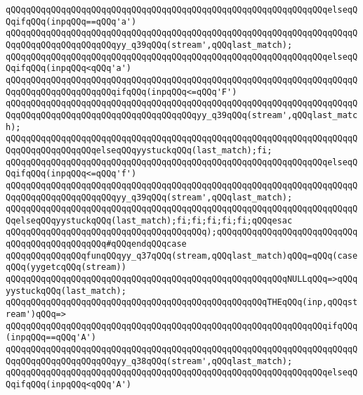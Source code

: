 \verb|qQQqqQQqqQQqqQQqqQQqqQQqqQQqqQQqqQQqqQQqqQQqqQQqqQQqqQQqqQQqqQQqelseqQQqifqQQq(inpqQQq==qQQq'a')|\newline
\verb|qQQqqQQqqQQqqQQqqQQqqQQqqQQqqQQqqQQqqQQqqQQqqQQqqQQqqQQqqQQqqQQqqQQqqQQqqQQqqQQqqQQqqQQqqQQqyy_q39qQQq(stream',qQQqlast_match);|\newline
\verb|qQQqqQQqqQQqqQQqqQQqqQQqqQQqqQQqqQQqqQQqqQQqqQQqqQQqqQQqqQQqqQQqelseqQQqifqQQq(inpqQQq<qQQq'a')|\newline
\verb|qQQqqQQqqQQqqQQqqQQqqQQqqQQqqQQqqQQqqQQqqQQqqQQqqQQqqQQqqQQqqQQqqQQqqQQqqQQqqQQqqQQqqQQqqQQqifqQQq(inpqQQq<=qQQq'F')|\newline
\verb|qQQqqQQqqQQqqQQqqQQqqQQqqQQqqQQqqQQqqQQqqQQqqQQqqQQqqQQqqQQqqQQqqQQqqQQqqQQqqQQqqQQqqQQqqQQqqQQqqQQqqQQqqQQqyy_q39qQQq(stream',qQQqlast_match);|\newline
\verb|qQQqqQQqqQQqqQQqqQQqqQQqqQQqqQQqqQQqqQQqqQQqqQQqqQQqqQQqqQQqqQQqqQQqqQQqqQQqqQQqqQQqqQQqelseqQQqyystuckqQQq(last_match);fi;|\newline
\verb|qQQqqQQqqQQqqQQqqQQqqQQqqQQqqQQqqQQqqQQqqQQqqQQqqQQqqQQqqQQqqQQqelseqQQqifqQQq(inpqQQq<=qQQq'f')|\newline
\verb|qQQqqQQqqQQqqQQqqQQqqQQqqQQqqQQqqQQqqQQqqQQqqQQqqQQqqQQqqQQqqQQqqQQqqQQqqQQqqQQqqQQqqQQqqQQqyy_q39qQQq(stream',qQQqlast_match);|\newline
\verb|qQQqqQQqqQQqqQQqqQQqqQQqqQQqqQQqqQQqqQQqqQQqqQQqqQQqqQQqqQQqqQQqqQQqqQQqelseqQQqyystuckqQQq(last_match);fi;fi;fi;fi;fi;qQQqesac|\newline
\verb|qQQqqQQqqQQqqQQqqQQqqQQqqQQqqQQqqQQqqQQq);qQQqqQQqqQQqqQQqqQQqqQQqqQQqqQQqqQQqqQQqqQQqqQQq#qQQqendqQQqcase|\newline
\verb|qQQqqQQqqQQqqQQqfunqQQqyy_q37qQQq(stream,qQQqlast_match)qQQq=qQQq(caseqQQq(yygetcqQQq(stream))|\newline
\verb|qQQqqQQqqQQqqQQqqQQqqQQqqQQqqQQqqQQqqQQqqQQqqQQqqQQqqQQqNULLqQQq=>qQQqyystuckqQQq(last_match);|\newline
\verb|qQQqqQQqqQQqqQQqqQQqqQQqqQQqqQQqqQQqqQQqqQQqqQQqqQQqTHEqQQq(inp,qQQqstream')qQQq=>|\newline
\verb|qQQqqQQqqQQqqQQqqQQqqQQqqQQqqQQqqQQqqQQqqQQqqQQqqQQqqQQqqQQqqQQqifqQQq(inpqQQq==qQQq'A')|\newline
\verb|qQQqqQQqqQQqqQQqqQQqqQQqqQQqqQQqqQQqqQQqqQQqqQQqqQQqqQQqqQQqqQQqqQQqqQQqqQQqqQQqqQQqqQQqqQQqyy_q38qQQq(stream',qQQqlast_match);|\newline
\verb|qQQqqQQqqQQqqQQqqQQqqQQqqQQqqQQqqQQqqQQqqQQqqQQqqQQqqQQqqQQqqQQqelseqQQqifqQQq(inpqQQq<qQQq'A')|\newline
